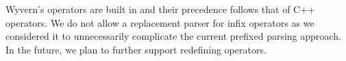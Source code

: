 Wyvern's operators are built in and their precedence follows that of
C++ operators. We do not allow a replacement parser for infix
operators as we considered it to unnecessarily complicate the current
prefixed parsing approach. In the future, we plan to further support
redefining operators.


